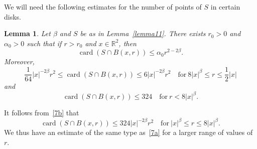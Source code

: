 \documentclass[12pt,a4paper]{amsart}
\theoremstyle{plain}
\newtheorem{lemma}[theorem]{Lemma}
\theoremstyle{definition}
\theoremstyle{remark}
\def\R{\mathbb R}
\def\card{\operatorname{card}}
\numberwithin{equation}{section}
\begin{document}
We will need the following estimates for the number of points of $S$ in certain
disks.
\begin{lemma} \label{lemma12}
Let $\beta$ and $S$ be as in Lemma~\ref{lemma11}.
There exists $r_0>0$ and $\alpha_0>0$ such that if $r>r_0$ and $x\in\R^2$, then 
\begin{equation}\label{7a0}
\card(S\cap B(x,r)) \leq \alpha_0 r^{2-2\beta}.
\end{equation}
Moreover,
\begin{equation}\label{7a}
\frac{1}{64} |x|^{-2\beta}r^2
\leq \card(S\cap B(x,r))
\leq 6 |x|^{-2\beta}r^2
\quad\text{for}\ 8|x|^\beta\leq r\leq \frac12 |x|
\end{equation}
and
\begin{equation}\label{7b}
\card(S\cap B(x,r))\leq 324
\quad\text{for}\ r<8|x|^\beta.
\end{equation}
\end{lemma} 
It follows from~\eqref{7b} that 
\begin{equation}\label{7a1}
\card(S\cap B(x,r))
\leq 324 |x|^{-2\beta}r^2
\quad\text{for}\ |x|^\beta\leq r\leq 8|x|^\beta  .
\end{equation}
We thus have an estimate of the same type as~\eqref{7a} for a larger range
of values of~$r$.
\end{document}
